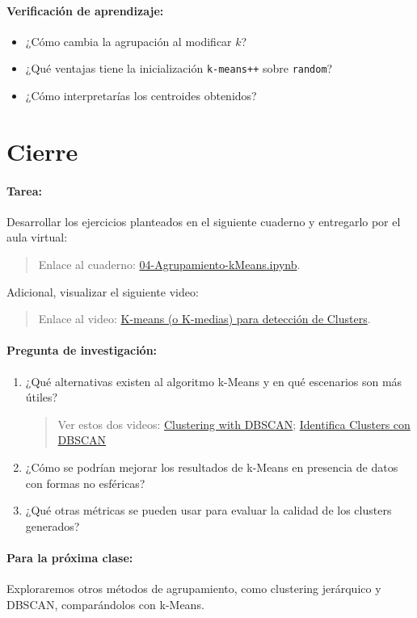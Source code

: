 \documentclass[a4,11pt]{aleph-notas}
\begin{document}
\paragraph{Verificación de aprendizaje:}  
\begin{itemize}[leftmargin=*]
    \item ¿Cómo cambia la agrupación al modificar \(k\)?
    \item ¿Qué ventajas tiene la inicialización \texttt{k-means++} sobre \texttt{random}?
    \item ¿Cómo interpretarías los centroides obtenidos?
\end{itemize}

\section*{Cierre}

\paragraph{Tarea:}
    Desarrollar los ejercicios planteados en el siguiente cuaderno y entregarlo por el aula virtual:
    \begin{quote}
        Enlace al cuaderno: \href{https://colab.research.google.com/github/andres-merino/AprendizajeAutomaticoInicial-05-N0105/blob/main/2-Ejercicios/03-Agrupamiento-Jerarquico.ipynb}{04-Agrupamiento-kMeans.ipynb}.
    \end{quote}
    Adicional, visualizar el siguiente video:
    \begin{quote}
        Enlace al video: \href{https://youtu.be/mICySHB0fh4?si=YuMBh5uQs4xyRt5u}{K-means (o K-medias) para detección de Clusters}.
    \end{quote}


\paragraph{Pregunta de investigación:}  
\begin{enumerate}[leftmargin=*]
    \item ¿Qué alternativas existen al algoritmo k-Means y en qué escenarios son más útiles?
    \begin{quote}
        Ver estos dos videos: \href{https://www.youtube.com/watch?v=RDZUdRSDOok}{Clustering with DBSCAN}; \href{https://www.youtube.com/watch?v=HMis89lGdkA}{Identifica Clusters con DBSCAN}
    \end{quote}
    \item ¿Cómo se podrían mejorar los resultados de k-Means en presencia de datos con formas no esféricas?
    \item ¿Qué otras métricas se pueden usar para evaluar la calidad de los clusters generados?
\end{enumerate}

\paragraph{Para la próxima clase:}  
Exploraremos otros métodos de agrupamiento, como clustering jerárquico y DBSCAN, comparándolos con k-Means.
\end{document}
